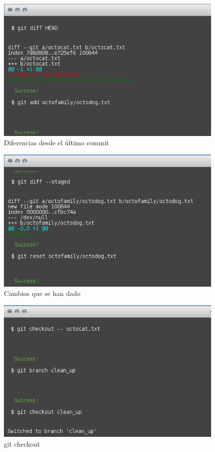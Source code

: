\documentclass[11pt]{article}
\begin{document}
\begin{figure}[H]
	\centering
	\includegraphics[scale=0.8]{git_8.png}
	\caption{Diferencias desde el último commit}
	\label{fig:c8}
\end{figure}

\begin{figure}[H]
	\centering
	\includegraphics[scale=0.8]{git_9.png}
	\caption{Cambios que se han dado}
	\label{fig:c9}
\end{figure}

\begin{figure}[H]
	\centering
	\includegraphics[scale=0.8]{git_10.png}
	\caption{git checkout}
	\label{fig:c10}
\end{figure}
\end{document}
